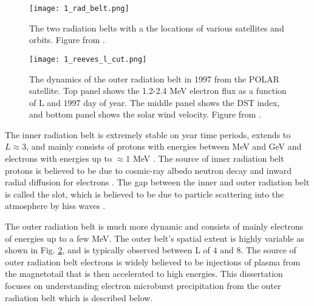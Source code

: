 \begin{figure}
\texttt{[image: 1\_rad\_belt.png]}
\caption{The two radiation belts with a the locations of various satellites and orbits. Figure from \citep{Horne2013}.}
\label{Intro:rad_belts}
\end{figure}

\begin{figure}
\texttt{[image: 1\_reeves\_l\_cut.png]}
\caption{The dynamics of the outer radiation belt in 1997 from the POLAR satellite. Top panel shows the 1.2-2.4 MeV electron flux as a function of L and 1997 day of year. The middle panel shows the DST index, and bottom panel shows the solar wind velocity. Figure from \citep{Reeves2003}.}
\label{Intro:reeves_l_cut}
\end{figure}

The inner radiation belt is extremely stable on year time periods, extends to $L \approx 3$, and mainly consists of protons with energies between MeV and GeV and electrons with energies up to $\approx 1$ MeV \citep{Claudepierre2019}. The source of inner radiation belt protons is believed to be due to cosmic-ray albedo neutron decay \citep[e.g.][]{Li2017_CRAND} and inward radial diffusion for electrons \citep[e.g.][]{O'Brien2016_inner}. The gap between the inner and outer radiation belt is called the slot, which is believed to be due to particle scattering into the atmosphere by hiss waves \citep[e.g.][]{Lyons1973, Breneman2015}.

The outer radiation belt is much more dynamic and consists of mainly electrons of energies up to a few MeV. The outer belt's spatial extent is highly variable as shown in Fig. \ref{Intro:reeves_l_cut}, and is typically observed between L of $4$ and $8$. The source of outer radiation belt electrons is widely believed to be injections of plasma from the magnetotail that is then accelerated to high energies. This dissertation focuses on understanding electron microburst precipitation from the outer radiation belt which is described below.

